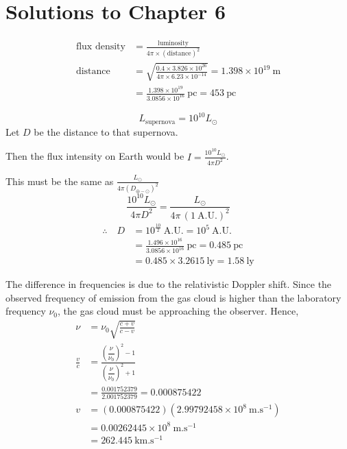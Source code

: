 
\clearpage
\section*{Solutions to Chapter 6}

\begin{align*}
\text{flux density} &= \frac{\text{luminosity}}{4\pi \times (\text{distance})^2}\\
\text{distance} &= \sqrt{\frac{0.4 \times 3.826 \times 10^{26}}{4\pi \times 6.23 \times 10^{-14}}}
  = 1.398 \times 10^{19}~\mathrm{m}\\
&= \frac{1.398 \times 10^{19}}{3.0856 \times 10^{16}}~\mathrm{pc} = 453~\mathrm{pc}
\end{align*}

\[
L_{\text{supernova}} = 10^{10} L_{\odot}
\]
Let $D$ be the distance to that supernova.

Then the flux intensity on Earth would be
$\displaystyle I = \frac{10^{10} L_{\odot}}{4\pi D^2}$.

This must be the same as $\displaystyle \frac{L_{\odot}}{4\pi \left(D_{\oplus-\odot}\right)^2}$
\[
\frac{10^{10} L_{\odot}}{4\pi D^2} = \frac{L_{\odot}}{4\pi\,(1~\mathrm{A.U.})^2}
\]
\begin{align*}
\therefore\quad D &= 10^{\frac{10}{2}}~\mathrm{A.U.} = 10^{5}~\mathrm{A.U.}\\
&= \frac{1.496 \times 10^{16}}{3.0856 \times 10^{16}}~\mathrm{pc} = 0.485~\mathrm{pc}\\
&= 0.485 \times 3.2615~\mathrm{ly} = 1.58~\mathrm{ly}
\end{align*}

The difference in frequencies is due to the relativistic Doppler shift. Since
the observed frequency of emission from the gas cloud is higher than the
laboratory frequency $\nu_0$, the gas cloud must be approaching the observer.
Hence,
\begin{align*}
\nu &= \nu_0 \sqrt{\frac{c+v}{c-v}}\\
\frac{v}{c} &= \frac{\left(\dfrac{\nu}{\nu_0}\right)^2 - 1}
                    {\left(\dfrac{\nu}{\nu_0}\right)^2 + 1}\\
&= \frac{0.001752379}{2.001752379} = 0.000875422\\
v &= \left(0.000875422\right)\left(2.99792458 \times 10^{8}~\mathrm{m.s^{-1}}\right)\\
&= 0.00262445 \times 10^{8}~\mathrm{m.s^{-1}}\\
&= 262.445~\mathrm{km.s^{-1}}
\end{align*}

